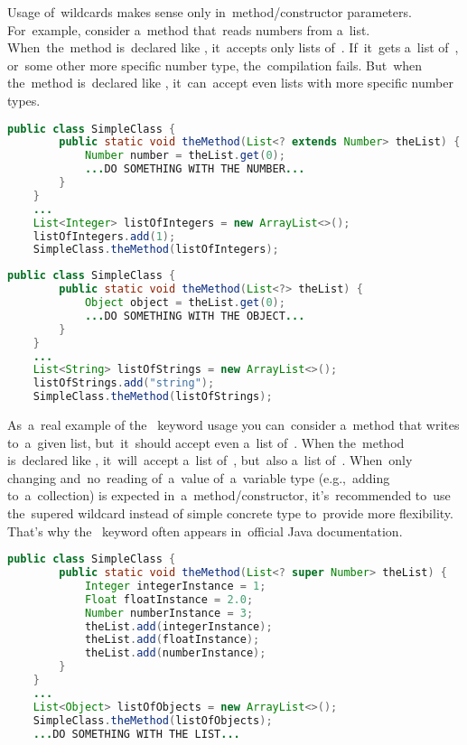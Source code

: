 Usage of~wildcards makes sense only in~method/constructor parameters.
For~example, consider a~method that~reads numbers from a~list.
When~the~method is~declared like , it~accepts only lists of~.
If~it~gets a~list of~,  or~some other more specific number type, the~compilation fails.
But~when the~method is~declared like , it~can~accept even lists with more specific number types.
\newpage

\begin{lstlisting}[language=Java]
    public class SimpleClass {
        public static void theMethod(List<? extends Number> theList) {
            Number number = theList.get(0);
            ...DO SOMETHING WITH THE NUMBER...
        }
    }
    ...
    List<Integer> listOfIntegers = new ArrayList<>();
    listOfIntegers.add(1);
    SimpleClass.theMethod(listOfIntegers);
\end{lstlisting}
\begin{lstlisting}[language=Java]
    public class SimpleClass {
        public static void theMethod(List<?> theList) {
            Object object = theList.get(0);
            ...DO SOMETHING WITH THE OBJECT...
        }
    }
    ...
    List<String> listOfStrings = new ArrayList<>();
    listOfStrings.add("string");
    SimpleClass.theMethod(listOfStrings);
\end{lstlisting}
\newline

\noindent As~a~real example of the~ keyword usage you can~consider a~method that writes  to~a~given list, but~it~should accept even a~list of~.
When the~method is~declared like , it~will~accept a~list of~, but~also a~list of~.
When~only changing and~no~reading of~a~value of~a~variable type (e.g.,~adding to~a~collection) is expected in~a~method/constructor, it's~recommended to~use the~supered wildcard instead of simple concrete type to~provide more flexibility.
That's why the~ keyword often appears in~official Java documentation.
\newpage

\begin{lstlisting}[language=Java]
    public class SimpleClass {
        public static void theMethod(List<? super Number> theList) {
            Integer integerInstance = 1;
            Float floatInstance = 2.0;
            Number numberInstance = 3;
            theList.add(integerInstance);
            theList.add(floatInstance);
            theList.add(numberInstance);
        }
    }
    ...
    List<Object> listOfObjects = new ArrayList<>();
    SimpleClass.theMethod(listOfObjects);
    ...DO SOMETHING WITH THE LIST...
\end{lstlisting}

